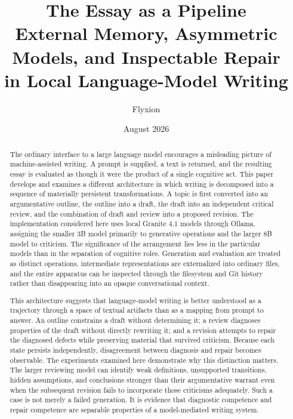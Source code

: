 \documentclass[11pt]{article}
\title{\textbf{The Essay as a Pipeline}\\
\large External Memory, Asymmetric Models, and Inspectable Repair\\
in Local Language-Model Writing}
\author{Flyxion}
\date{August 2026}
\begin{document}
\maketitle

\begin{abstract}

The ordinary interface to a large language model encourages a misleading picture of machine-assisted writing. A prompt is supplied, a text is returned, and the resulting essay is evaluated as though it were the product of a single cognitive act. This paper develops and examines a different architecture in which writing is decomposed into a sequence of materially persistent transformations. A topic is first converted into an argumentative outline, the outline into a draft, the draft into an independent critical review, and the combination of draft and review into a proposed revision. The implementation considered here uses local Granite 4.1 models through Ollama, assigning the smaller 3B model primarily to generative operations and the larger 8B model to criticism. The significance of the arrangement lies less in the particular models than in the separation of cognitive roles. Generation and evaluation are treated as distinct operations, intermediate representations are externalized into ordinary files, and the entire apparatus can be inspected through the filesystem and Git history rather than disappearing into an opaque conversational context.

This architecture suggests that language-model writing is better understood as a trajectory through a space of textual artifacts than as a mapping from prompt to answer. An outline constrains a draft without determining it; a review diagnoses properties of the draft without directly rewriting it; and a revision attempts to repair the diagnosed defects while preserving material that survived criticism. Because each state persists independently, disagreement between diagnosis and repair becomes observable. The experiments examined here demonstrate why this distinction matters. The larger reviewing model can identify weak definitions, unsupported transitions, hidden assumptions, and conclusions stronger than their argumentative warrant even when the subsequent revision fails to incorporate those criticisms adequately. Such a case is not merely a failed generation. It is evidence that diagnostic competence and repair competence are separable properties of a model-mediated writing system.


\end{abstract}
\end{document}
